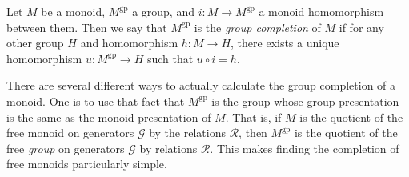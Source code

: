 \begin{defn} Let $M$ be a monoid, $M^{\mathrm{gp}}$ a group, and $i: M \to M^{\mathrm{gp}}$ a monoid homomorphism between them. Then we say that $M^{\mathrm{gp}}$ is the \emph{group completion} of $M$ if for any other group $H$ and homomorphism $h: M \to H$, there exists a unique homomorphism $u: M^{\mathrm{gp}} \to H$ such that $u \circ i = h$.
\end{defn}

There are several different ways to actually calculate the group completion of a monoid. One is to use that fact that $M^{\mathrm{gp}}$ is the group whose group presentation is the same as the monoid presentation of $M$. That is, if $M$ is the quotient of the free monoid on generators $\mathcal{G}$ by the relations $\mathcal{R}$, then $M^{\mathrm{gp}}$ is the quotient of the free \emph{group} on generators $\mathcal{G}$ by relations $\mathcal{R}$. This makes finding the completion of free monoids particularly simple.

